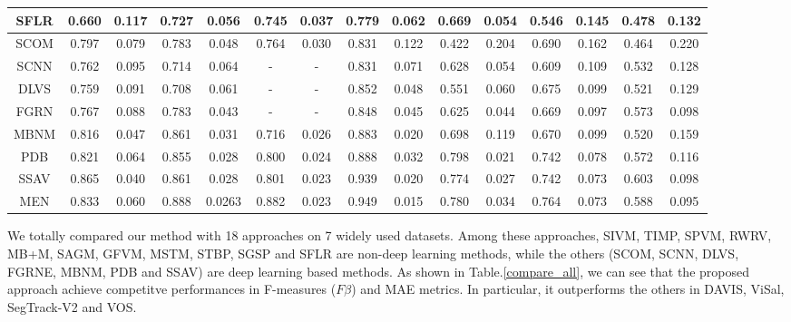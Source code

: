 \documentclass[12pt]{article}
\begin{document}
\begin{table}[]
\begin{tabular}{|c|c|c|c|c|c|c|c|c|c|c|c|c|c|c|}
SFLR & 0.660 & 0.117 & 0.727 & 0.056 & 0.745 & 0.037 & 0.779 & 0.062 & 0.669 & 0.054 & 0.546 & 0.145 & 0.478 & 0.132 \\ \hline
SCOM & 0.797 & 0.079 & 0.783 & 0.048 & 0.764 & 0.030 & 0.831 & 0.122 & 0.422 & 0.204 & 0.690 & 0.162 & 0.464 & 0.220 \\ \hline
SCNN & 0.762 & 0.095 & 0.714 & 0.064 & - & - & 0.831 & 0.071 & 0.628 & 0.054 & 0.609 & 0.109 & 0.532 & 0.128 \\ \hline
DLVS & 0.759 & 0.091 & 0.708 & 0.061 & - & - & 0.852 & 0.048 & 0.551 & 0.060 & 0.675 & 0.099 & 0.521 & 0.129 \\ \hline
FGRN & 0.767 & 0.088 & 0.783 & 0.043 & - & - & 0.848 & 0.045 & 0.625 & 0.044 & 0.669 & 0.097 & 0.573 & 0.098 \\ \hline
MBNM & 0.816 & 0.047 & 0.861 & 0.031 & 0.716 & 0.026 & 0.883 & 0.020 & 0.698 & 0.119 & 0.670 & 0.099 & 0.520 & 0.159 \\ \hline
PDB & 0.821 & 0.064 & 0.855 & 0.028 & 0.800 & 0.024 & 0.888 & 0.032 & 0.798 & 0.021 & 0.742 & 0.078 & 0.572 & 0.116 \\ \hline
SSAV & 0.865 & 0.040 & 0.861 & 0.028 & 0.801 & 0.023 & 0.939 & 0.020 & 0.774 & 0.027 & 0.742 & 0.073 & 0.603 & 0.098 \\ \hline
MEN & 0.833 & 0.060 & 0.888 & 0.0263 & 0.882 & 0.023 & 0.949 & 0.015 & 0.780 & 0.034 & 0.764 & 0.073 & 0.588 & 0.095 \\ \hline
\end{tabular}
\end{table}

We totally compared our method with 18 approaches on 7 widely used datasets. Among these approaches, SIVM, TIMP, SPVM, RWRV, MB+M, SAGM, GFVM, MSTM, STBP, SGSP and SFLR are non-deep learning methods, while the others (SCOM, SCNN, DLVS, FGRNE, MBNM, PDB and SSAV) are deep learning based methods. As shown in Table.\ref{compare_all}, we can see that the proposed approach achieve competitve performances in F-measures ($F\beta$) and MAE metrics. In particular, it outperforms the others in DAVIS, ViSal, SegTrack-V2 and VOS.
\end{document}

